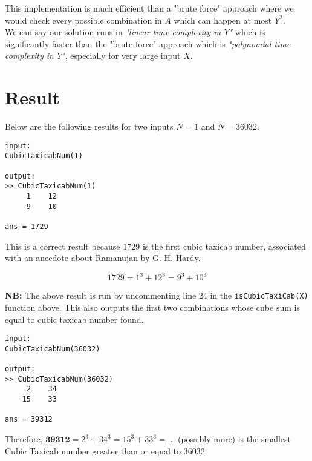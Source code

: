 \documentclass[12pt]{report}
\begin{document}
This implementation is much efficient than a "brute force" approach where we would check every possible combination in $A$ which can happen at most $Y^2$. \\

We can say our solution runs in \textit{"linear time complexity in $Y$"} which is significantly faster than the "brute force" approach which is \textit{"polynomial time complexity in $Y$"}, especially for very large input $X$.

\section{Result}
Below are the following results for two inputs $N=1$ and $N=36032$. \\

\begin{lstlisting}[title={N=1}]
input:
CubicTaxicabNum(1)

output:
>> CubicTaxicabNum(1)
     1    12
     9    10

ans = 1729
\end{lstlisting}

This is a correct result because 1729 is the first cubic taxicab number, associated with an anecdote about Ramanujan by G. H. Hardy.

\begin{equation*}
	1729 = 1^3 + 12^3 = 9^3 + 10^3
\end{equation*}

\textbf{NB:} The above result is run by uncommenting line 24 in the \texttt{isCubicTaxiCab(X)} function above. This also outputs the first two combinations whose cube sum is equal to cubic taxicab number found. \\
\begin{lstlisting}[title={N=36032}]
input:
CubicTaxicabNum(36032)

output:
>> CubicTaxicabNum(36032)
     2    34
    15    33

ans = 39312
\end{lstlisting}
Therefore, $\textbf{39312} = 2^3 +34^3 = 15^3 + 33^3 = ...$ (possibly more) is the smallest Cubic Taxicab number greater than or equal to 36032
\end{document}
